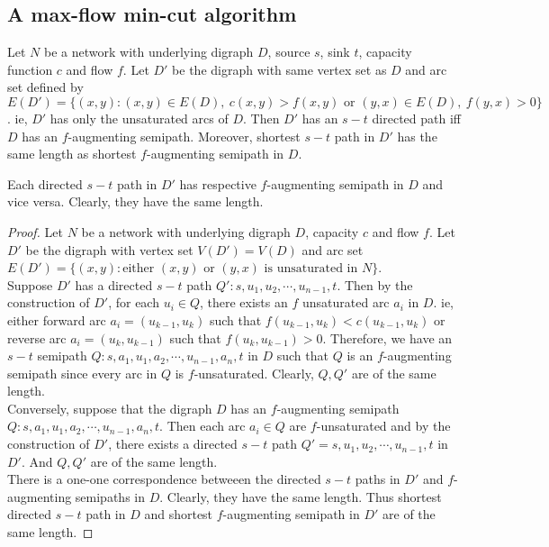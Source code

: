 \subsection{A max-flow min-cut algorithm}
\begin{theorem}
	Let $N$ be a network with underlying digraph $D$, source $s$, sink $t$, capacity function $c$ and flow $f$.
	Let $D'$ be the digraph with same vertex set as $D$ and arc set defined by $E(D') = \{ (x,y) : (x,y) \in E(D),\ c(x,y) > f(x,y) \text{ or } (y,x) \in E(D),\ f(y,x) > 0 \}$.
	ie, $D'$ has only the unsaturated arcs of $D$.
	Then $D'$ has an $s-t$ directed path iff $D$ has an $f$-augmenting semipath.
	Moreover, shortest $s-t$ path in $D'$ has the same length as shortest $f$-augmenting semipath in $D$.
\end{theorem}
\begin{synopsis}
	Each directed $s-t$ path in $D'$ has respective $f$-augmenting semipath in $D$ and vice versa.
	Clearly, they have the same length.
\end{synopsis}
\begin{proof}
	Let $N$ be a network with underlying digraph $D$, capacity $c$ and flow $f$.
	Let $D'$ be the digraph with vertex set $V(D') = V(D)$ and arc set $E(D') = \{ (x,y) : \text{either }(x,y) \text{ or } (y,x) \text{ is unsaturated in } N \}$.\\


	Suppose $D'$ has a directed $s-t$ path $Q' : s,u_1,u_2,\cdots,u_{n-1},t$.
	Then by the construction of $D'$, for each $u_i \in Q$, there exists an $f$ unsaturated arc $a_i$ in $D$.
	ie, either forward arc $a_i = (u_{k-1},u_k)$ such that $f(u_{k-1},u_k) < c(u_{k-1},u_k)$ or reverse arc $a_i = (u_k,u_{k-1})$ such that $f(u_k,u_{k-1}) > 0$.
	Therefore, we have an $s-t$ semipath $Q : s,a_1,u_1,a_2,\cdots,u_{n-1},a_n,t$ in $D$ such that $Q$ is an $f$-augmenting semipath since every arc in $Q$ is $f$-unsaturated.
	Clearly, $Q,Q'$ are of the same length.\\


	Conversely, suppose that the digraph $D$ has an $f$-augmenting semipath $Q : s,a_1,u_1,a_2,\cdots,u_{n-1},a_n,t$.
	Then each arc $a_i \in Q$ are $f$-unsaturated and by the construction of $D'$, there exists a directed $s-t$ path $Q' = s,u_1,u_2,\cdots,u_{n-1},t$ in $D'$.
	And $Q,Q'$ are of the same length.\\


	There is a one-one correspondence betweeen the directed $s-t$ paths in $D'$ and $f$-augmenting semipaths in $D$.
	Clearly, they have the same length.
	Thus shortest directed $s-t$ path in $D$ and shortest $f$-augmenting semipath in $D'$ are of the same length.
\end{proof}

